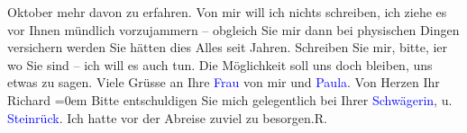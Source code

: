                   Oktober mehr davon zu erfahren.\pend
           \pstart
           Von mir will ich nichts schreiben, ich ziehe es vor Ihnen mündlich vorzujammern –
               obgleich {\pb}Sie mir dann bei
               physischen Dingen versichern werden Sie hätten dies Alles seit Jahren.\pend
           \pstart
           Schreiben Sie mir, bitte, i{\geminationm}er wo Sie sind – ich will es
               auch tun. Die Möglichkeit soll uns doch bleiben, uns etwas zu sagen.\pend
           \pstart
           Viele Grüsse an Ihre \textcolor{blue}{Frau}{} von
               mir und \textcolor{blue}{Paula}{}\ledrightnote{\textcolor{blue}{Paula Beer-Hofmann}}.\pend
           \pstart
           Von Herzen Ihr{\\[\baselineskip]}\spacefill\mbox{Richard}\pend
           \leftskip=0em{}\pstart
           \noindent{}Bitte entschuldigen Sie mich gelegentlich bei Ihrer \textcolor{blue}{Schwägerin}{}, u. \textcolor{blue}{Steinrück}{}\ledrightnote{\textcolor{blue}{Albert Steinrück}}. Ich hatte vor der Abreise zuviel zu besorgen.\hspace*{1.5em}R.\pend
           \endnumbering{}  
      